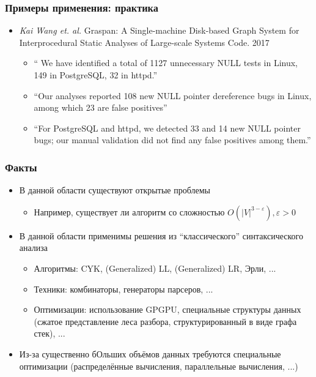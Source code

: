 \documentclass[xcolor=table,aspectratio=169]{beamer}
\begin{document}
\begin{frame}
  \transwipe[direction=90]
  \frametitle{Примеры применения: практика}

\begin{itemize} 

\item \emph{Kai Wang et. al.} Graspan: A Single-machine Disk-based Graph System for Interprocedural 
Static Analyses of Large-scale Systems Code. 2017
  
\begin{itemize} 
   \item `` We have identified a total of 1127 unnecessary NULL tests in Linux, 149 in PostgreSQL, 
   32 in httpd.''
   \item ``Our analyses reported 108 new NULL pointer dereference bugs in Linux, among which 23 are false positives''
   \item ``For PostgreSQL and httpd, we detected 33 and 14 new NULL pointer bugs; our manual 
   validation did not find any false positives among them.''
\end{itemize}

\end{itemize}

\end{frame}



\begin{frame}[fragile]
  \transwipe[direction=90]
  \frametitle{Факты}
  \begin{itemize}
  \item В данной области существуют открытые проблемы
    \begin{itemize}
        \item Например, существует ли алгоритм со сложностью $O(|V|^{3-\varepsilon}), \varepsilon > 0$
    \end{itemize}
  \item В данной области применимы решения из ``классического'' синтаксического анализа
    \begin{itemize}
        \item Алгоритмы: CYK, (Generalized) LL, (Generalized) LR, Эрли, ...
        \item Техники: комбинаторы, генераторы парсеров, ... 
        \item Оптимизации: использование GPGPU, специальные структуры данных (сжатое представление леса разбора, структурированный в виде графа стек), ...
    \end{itemize}
  \item Из-за существенно бОльших объёмов данных требуются специальные оптимизации (распределённые вычисления, параллельные вычисления, ...)
  \end{itemize}

\end{frame}
\end{document}
